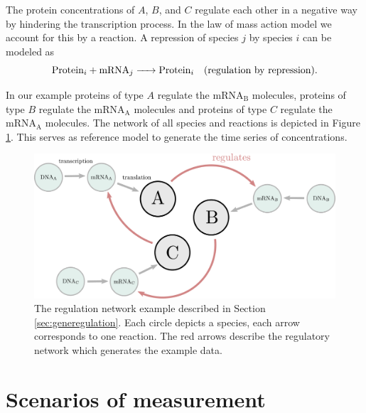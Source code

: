 \documentclass[oneside, abstracton, titlepage]{scrartcl}
\begin{document}
    The protein concentrations of $A$, $B$, and $C$ regulate each other in a negative way by hindering the transcription process. In the law of mass action model we account for this by a reaction. A repression of species $j$ by species $i$ can be modeled as
    \begin{equation*}
        \ce{ Protein_i + mRNA_j -> Protein_i } \quad \text{(regulation by repression)}.
    \end{equation*}

    In our example proteins of type $A$ regulate the mRNA$_\mathrm{B}$ molecules, proteins of type $B$ regulate the mRNA$_\mathrm{A}$ molecules and proteins of type $C$ regulate the mRNA$_\mathrm{A}$ molecules. The network of all species and reactions is depicted in Figure \ref{fig:network}. This serves as reference model to generate the time series of concentrations.
    \begin{figure}
        \centering
        \includegraphics[width=.5\textwidth]{./figures_tex/gene_regulation_full.pdf}
        \caption{The regulation network example described in Section \ref{sec:generegulation}. Each circle depicts a species, each arrow corresponds to one reaction. The red arrows describe the regulatory network which generates the example data.}
        \label{fig:network}
    \end{figure}


    \section{Scenarios of measurement}\label{sec:scenarios-of-measurement}
\end{document}
